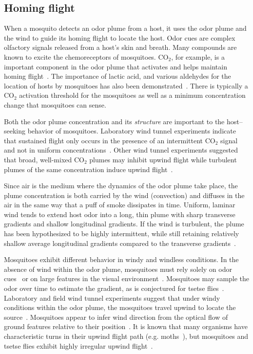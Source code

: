 \documentclass[12pt]{article}
\begin{document}
\subsection{Homing flight}
When a mosquito detects an odor plume from a host, it uses the odor plume and the wind to guide its homing flight to locate the host.
Odor cues are complex olfactory signals released from a host's skin and breath. Many compounds are known to excite the chemoreceptors of mosquitoes.
%
CO$_2$, for example, is a important component in the odor plume that activates and helps maintain homing flight~\cite{Bowen1991,Gibson1999,Gillies1980}. The importance of lactic acid, and various
aldehydes for the location of hosts by mosquitoes has also been demonstrated~\cite{Bowen1991,Syed2009}.
There is typically a CO$_2$ activation threshold for the mosquitoes as well as a minimum concentration change that mosquitoes can sense.








Both the odor plume concentration and its {\em structure} are important to the  host--seeking behavior of mosquitoes. Laboratory wind tunnel experiments indicate that
sustained flight only occurs in the presence of an intermittent CO$_2$ signal and not in uniform
concentrations~\cite{Gillies1980}.  Other wind tunnel experiments suggested that broad,
well-mixed CO$_2$ plumes may inhibit upwind flight while turbulent plumes of the same concentration induce
upwind flight~\cite{Dekker2005,Dekker2001}.

Since air is the medium where the dynamics of the odor plume take place, the plume concentration is both carried by the wind (convection) and diffuses in the air in the same way that a puff of smoke dissipates in time.
Uniform, laminar wind tends to extend host odor into a long, thin plume with sharp transverse gradients and shallow longitudinal gradients. If the wind is turbulent, the plume has been hypothesized to be highly intermittent, while still retaining relatively shallow average longitudinal gradients compared to the transverse
gradients~\cite{Vickers2000}.


Mosquitoes exhibit different behavior in windy and windless conditions. In the absence of wind within the odor plume, mosquitoes must rely solely on odor cues~\cite{Vickers2000} or on large features in the visual environment~\cite{Bidlingmayer1994}. Mosquitoes may sample the odor over time to estimate the gradient, as is conjectured for tsetse flies~\cite{Carde1996}.
%
Laboratory and field wind tunnel experiments suggest that under windy conditions within the odor plume, the mosquitoes travel upwind to locate the source~\cite{Cooperband2006, Dekker2005,Dekker2001}. Mosquitoes appear to infer wind direction from the optical flow of ground features relative to their position~\cite{Carde1996}.
It is known that many organisms have characteristic turns in their upwind flight path (e.g. moths~\cite{Carde1996,Vickers2000}), but mosquitoes and tsetse flies exhibit highly irregular upwind flight~\cite{Davis1996}.
\end{document}
